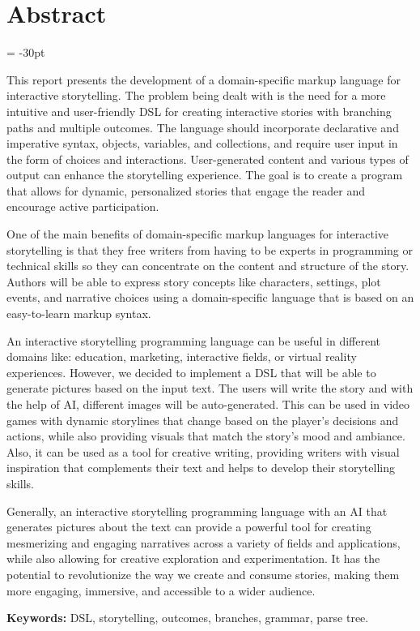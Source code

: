 \chapter*{Abstract}
\oddsidemargin = -30pt

This report presents the development of a domain-specific markup language for interactive storytelling.
The problem being dealt with is the need for a more intuitive and user-friendly DSL for creating interactive stories with branching paths and multiple outcomes. The language should incorporate declarative and imperative syntax, objects, variables, and collections, and require user input in the form of choices and interactions. User-generated content and various types of output can enhance the storytelling experience. The goal is to create a program that allows for dynamic, personalized stories that engage the reader and encourage active participation. 

One of the main benefits of domain-specific markup languages for interactive storytelling is that they free writers from having to be experts in programming or technical skills so they can concentrate on the content and structure of the story. Authors will be able to express story concepts like characters, settings, plot events, and narrative choices using a domain-specific language that is based on an easy-to-learn markup syntax.

An interactive storytelling programming language can be useful in different domains like: education, marketing, interactive fields, or virtual reality experiences. However, we decided to implement a DSL that will be able to generate pictures based on the input text. The users will write the story and with the help of AI, different images will be auto-generated. This can be used in video games with dynamic storylines that change based on the player's decisions and actions, while also providing visuals that match the story's mood and ambiance. Also, it can be used as a tool for creative writing, providing writers with visual inspiration that complements their text and helps to develop their storytelling skills. 

Generally, an interactive storytelling programming language with an AI that generates pictures about the text can provide a powerful tool for creating mesmerizing and engaging narratives across a variety of fields and applications, while also allowing for creative exploration and experimentation. It has the potential to revolutionize the way we create and consume stories, making them more engaging, immersive, and accessible to a wider audience.

\textbf{Keywords: }  DSL, storytelling, outcomes, branches, grammar, parse tree.